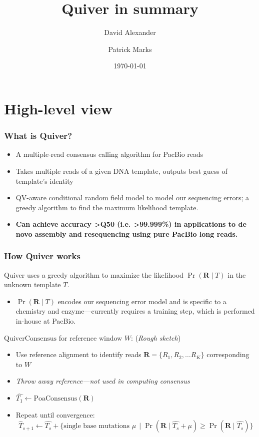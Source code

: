 \documentclass[serif,11pt]{beamer}
\title{Quiver in summary}
\author{David Alexander \and Patrick Marks}
\date{\today}
\begin{document}
\maketitle


\section{High-level view}
\label{sec-1}
\begin{frame}
\frametitle{What is Quiver?}
\label{sec-1-1}

\begin{itemize}
\item A multiple-read consensus calling algorithm for PacBio reads
\item Takes multiple reads of a given DNA template, outputs best guess
     of template's identity
\item QV-aware conditional random field model to model our sequencing
     errors; a greedy algorithm to find the maximum likelihood
     template.
\item \textbf{Can achieve accuracy >Q50 (i.e. >99.999\%) in applications to de      novo assembly and resequencing using pure PacBio long reads.}
\end{itemize}
\end{frame}
\begin{frame}
\frametitle{How Quiver works}
\label{sec-1-2}

   Quiver uses a greedy algorithm to maximize the likelihood
   $\Pr(\mathbf{R} \mid T)$ in the unknown template $T$.

\begin{itemize}
\item $\Pr(\mathbf{R} \mid T)$ encodes our sequencing error model and is
     specific to a chemistry and enzyme---currently requires a training
     step, which is performed in-house at PacBio.
\end{itemize}

   $\mathrm{QuiverConsensus}$ for reference window $W$: (\emph{Rough sketch})
\begin{itemize}
\item Use reference alignment to identify reads $\mathbf{R}=\{R_1, R_2, \ldots R_K\}$
     corresponding to $W$
\item \emph{Throw away reference---not used in computing consensus}
\item $\hat{T_1} \leftarrow \mathrm{PoaConsensus}(\mathbf{R})$
\item Repeat until convergence:
     $$\hat{T}_{s+1} \leftarrow \hat{T_{s}} +
     \big\{\text{single base mutations } \mu \, \mid
     \Pr(\mathbf{R} \mid \hat{T_s} + \mu) \geq \Pr(\mathbf{R} \mid \hat{T_s}) \big\}$$
\end{itemize}
\end{frame}
\end{document}
